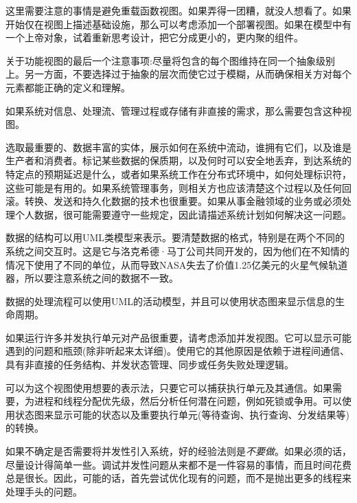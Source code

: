 \begin{tcolorbox}[colback=webgreen!5!white,colframe=webgreen!75!black, title=TIP]
\hspace*{0.7cm}这里需要注意的事情是避免重载函数视图。如果弄得一团糟，就没人想看了。如果开始仅在视图上描述基础设施，那么可以考虑添加一个部署视图。如果在模型中有一个上帝对象，试着重新思考设计，把它分成更小的，更内聚的组件。
\end{tcolorbox}

关于功能视图的最后一个注意事项:尽量将包含的每个图维持在同一个抽象级别上。另一方面，不要选择过于抽象的层次而使它过于模糊，从而确保相关方对每个元素都能正确的定义和理解。


如果系统对信息、处理流、管理过程或存储有非直接的需求，那么需要包含这种视图。

选取最重要的、数据丰富的实体，展示如何在系统中流动，谁拥有它们，以及谁是生产者和消费者。标记某些数据的保质期，以及何时可以安全地丢弃，到达系统的特定点的预期延迟是什么，或者如果系统工作在分布式环境中，如何处理标识符，这些可能是有用的。如果系统管理事务，则相关方也应该清楚这个过程以及任何回滚。转换、发送和持久化数据的技术也很重要。如果从事金融领域的业务或必须处理个人数据，很可能需要遵守一些规定，因此请描述系统计划如何解决这一问题。

数据的结构可以用UML类模型来表示。要清楚数据的格式，特别是在两个不同的系统之间交互时。这是它与洛克希德·马丁公司共同开发的，因为他们在不知情的情况下使用了不同的单位，从而导致NASA失去了价值1.25亿美元的火星气候轨道器，所以要注意系统之间的数据不一致。

数据的处理流程可以使用UML的活动模型，并且可以使用状态图来显示信息的生命周期。


如果运行许多并发执行单元对产品很重要，请考虑添加并发视图。它可以显示可能遇到的问题和瓶颈(除非听起来太详细)。使用它的其他原因是依赖于进程间通信、具有非直接的任务结构、并发状态管理、同步或任务失败处理逻辑。

可以为这个视图使用想要的表示法，只要它可以捕获执行单元及其通信。如果需要，为进程和线程分配优先级，然后分析任何潜在问题，例如死锁或争用。可以使用状态图来显示可能的状态以及重要执行单元(等待查询、执行查询、分发结果等)的转换。

如果不确定是否需要将并发性引入系统，好的经验法则是\textit{不要做}。如果必须的话，尽量设计得简单一些。调试并发性问题从来都不是一件容易的事情，而且时间花费总是很长。因此，可能的话，首先尝试优化现有的问题，而不是抛出更多的线程来处理手头的问题。

